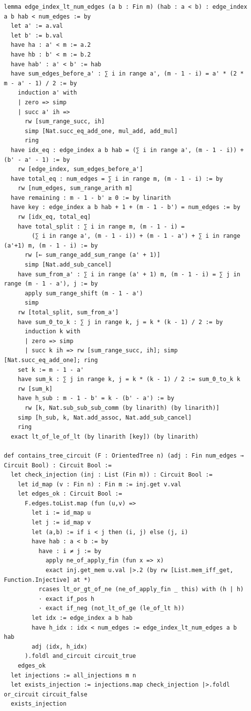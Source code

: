 \documentclass[11pt,a4paper]{article}
\begin{document}
\begin{lstlisting}[style=lean, caption={SeriesXXVIII/SumnerCircuit.lean (final)}]
lemma edge_index_lt_num_edges (a b : Fin m) (hab : a < b) : edge_index a b hab < num_edges := by
  let a' := a.val
  let b' := b.val
  have ha : a' < m := a.2
  have hb : b' < m := b.2
  have hab' : a' < b' := hab
  have sum_edges_before_a' : ∑ i in range a', (m - 1 - i) = a' * (2 * m - a' - 1) / 2 := by
    induction a' with
    | zero => simp
    | succ a' ih =>
      rw [sum_range_succ, ih]
      simp [Nat.succ_eq_add_one, mul_add, add_mul]
      ring
  have idx_eq : edge_index a b hab = (∑ i in range a', (m - 1 - i)) + (b' - a' - 1) := by
    rw [edge_index, sum_edges_before_a']
  have total_eq : num_edges = ∑ i in range m, (m - 1 - i) := by
    rw [num_edges, sum_range_arith m]
  have remaining : m - 1 - b' ≥ 0 := by linarith
  have key : edge_index a b hab + 1 + (m - 1 - b') = num_edges := by
    rw [idx_eq, total_eq]
    have total_split : ∑ i in range m, (m - 1 - i) =
        (∑ i in range a', (m - 1 - i)) + (m - 1 - a') + ∑ i in range (a'+1) m, (m - 1 - i) := by
      rw [← sum_range_add_sum_range (a' + 1)]
      simp [Nat.add_sub_cancel]
    have sum_from_a' : ∑ i in range (a' + 1) m, (m - 1 - i) = ∑ j in range (m - 1 - a'), j := by
      apply sum_range_shift (m - 1 - a')
      simp
    rw [total_split, sum_from_a']
    have sum_0_to_k : ∑ j in range k, j = k * (k - 1) / 2 := by
      induction k with
      | zero => simp
      | succ k ih => rw [sum_range_succ, ih]; simp [Nat.succ_eq_add_one]; ring
    set k := m - 1 - a'
    have sum_k : ∑ j in range k, j = k * (k - 1) / 2 := sum_0_to_k k
    rw [sum_k]
    have h_sub : m - 1 - b' = k - (b' - a') := by
      rw [k, Nat.sub_sub_sub_comm (by linarith) (by linarith)]
    simp [h_sub, k, Nat.add_assoc, Nat.add_sub_cancel]
    ring
  exact lt_of_le_of_lt (by linarith [key]) (by linarith)

def contains_tree_circuit (F : OrientedTree n) (adj : Fin num_edges → Circuit Bool) : Circuit Bool :=
  let check_injection (inj : List (Fin m)) : Circuit Bool :=
    let id_map (v : Fin n) : Fin m := inj.get v.val
    let edges_ok : Circuit Bool :=
      F.edges.toList.map (fun (u,v) =>
        let i := id_map u
        let j := id_map v
        let (a,b) := if i < j then (i, j) else (j, i)
        have hab : a < b := by
          have : i ≠ j := by
            apply ne_of_apply_fin (fun x => x)
            exact inj.get_mem u.val |>.2 (by rw [List.mem_iff_get, Function.Injective] at *)
          rcases lt_or_gt_of_ne (ne_of_apply_fin _ this) with (h | h)
          · exact if_pos h
          · exact if_neg (not_lt_of_ge (le_of_lt h))
        let idx := edge_index a b hab
        have h_idx : idx < num_edges := edge_index_lt_num_edges a b hab
        adj ⟨idx, h_idx⟩
      ).foldl and_circuit circuit_true
    edges_ok
  let injections := all_injections m n
  let exists_injection := injections.map check_injection |>.foldl or_circuit circuit_false
  exists_injection


\end{lstlisting}
\end{document}
